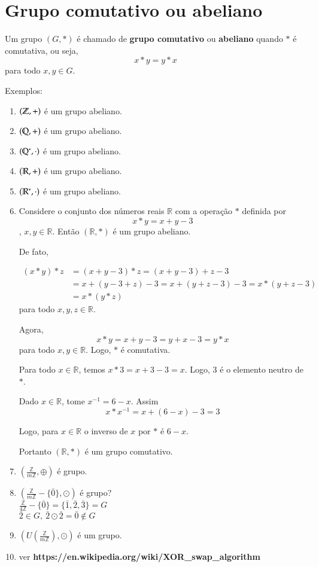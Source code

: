 \section{Grupo comutativo ou abeliano}
\begin{definicao} Um grupo $(G,*)$ {\'e} chamado de \textbf{grupo comutativo} ou \textbf{abeliano} quando $*$ {\'e} comutativa, ou seja, \[x*y=y*x\] para todo $x,y\in G$.
\end{definicao}
\vspace{1cm}

Exemplos:
\begin{enumerate}
\item $(\mathbb{Z},+)$ {\'e} um grupo abeliano.
\item $(\mathbb{Q},+)$ {\'e} um grupo abeliano.
\item $(\mathbb{Q}^*,\cdot)$ {\'e} um grupo abeliano.
\item $(\mathbb{R},+)$ {\'e} um grupo abeliano.
\item $(\mathbb{R}^*,\cdot)$ {\'e} um grupo abeliano.
\item Considere o conjunto dos n{\'u}meros reais $\mathbb{R}$ com a opera{\c c}{\~a}o $*$ definida por \[x*y=x+y-3\], $x,y\in\mathbb{R}$. Ent{\~a}o $(\mathbb{R},*)$ {\'e} um grupo abeliano.
\begin{solucao}
	De fato,

	\begin{align*}
		(x*y)*z &= (x+y-3)*z = (x+y-3)+z-3\\
		&= x+(y-3+z)-3 = x+(y+z-3)-3 = x*(y+z-3)\\
		&= x*(y*z)
	\end{align*}
	para todo $x,y,z\in \mathbb{R}$.

	Agora,
	\[
		x*y=x+y-3=y+x-3=y*x
	\]
	para todo $x,y\in\mathbb{R}$. Logo, $*$ {\'e} comutativa.

	Para todo $x\in\mathbb{R}$, temos $x*3=x+3-3=x$. Logo, 3 {\'e} o elemento neutro de $*$.

	Dado $x\in\mathbb{R}$, tome $x^{-1}=6-x$. Assim \[x*x^{-1}=x+(6-x)-3=3\]

	Logo, para $x\in\mathbb{R}$ o inverso de $x$ por $*$ {\'e} $6-x$.

	Portanto $(\mathbb{R}, *)$ {\'e} um grupo comutativo.
\end{solucao}

\item $\left(\displaystyle\frac{\mathbb{Z}}{m\mathbb{Z}},\oplus\right)$ {\'e} grupo.
\item $\left(\displaystyle\frac{\mathbb{Z}}{m\mathbb{Z}}-\{\bar{0}\},\odot\right)$ {\'e} grupo?\\
$\displaystyle\frac{\mathbb{Z}}{4\mathbb{Z}}-\{\bar{0}\}=\{\bar{1},\bar{2},\bar{3}\}=G$\\
$\bar{2}\in G,\ \bar{2}\odot\bar{2}=\bar{0}\notin G$
\item $\left(U\left(\displaystyle\frac{\mathbb{Z}}{m\mathbb{Z}}\right),\odot\right)$ {\'e} um grupo.
\item ver \textbf{https://en.wikipedia.org/wiki/XOR\_swap\_algorithm}
\end{enumerate}


